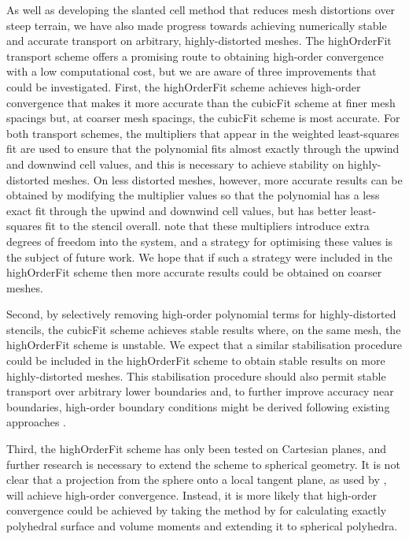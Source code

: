 As well as developing the slanted cell method that reduces mesh distortions over steep terrain, we have also made progress towards achieving numerically stable and accurate transport on arbitrary, highly-distorted meshes.
The highOrderFit transport scheme offers a promising route to obtaining high-order convergence with a low computational cost, but we are aware of three improvements that could be investigated.
First, the highOrderFit scheme achieves high-order convergence that makes it more accurate than the cubicFit scheme at finer mesh spacings but, at coarser mesh spacings, the cubicFit scheme is most accurate.
For both transport schemes, the multipliers that appear in the weighted least-squares fit are used to ensure that the polynomial fits almost exactly through the upwind and downwind cell values, and this is necessary to achieve stability on highly-distorted meshes.
On less distorted meshes, however, more accurate results can be obtained by modifying the multiplier values so that the polynomial has a less exact fit through the upwind and downwind cell values, but has better least-squares fit to the stencil overall.
\citet{devendran2017} note that these multipliers introduce extra degrees of freedom into the system, and a strategy for optimising these values is the subject of future work.
We hope that if such a strategy were included in the highOrderFit scheme then more accurate results could be obtained on coarser meshes.

Second, by selectively removing high-order polynomial terms for highly-distorted stencils, the cubicFit scheme achieves stable results where, on the same mesh, the highOrderFit scheme is unstable.
We expect that a similar stabilisation procedure could be included in the highOrderFit scheme to obtain stable results on more highly-distorted meshes.
This stabilisation procedure should also permit stable transport over arbitrary lower boundaries and, to further improve accuracy near boundaries, high-order boundary conditions might be derived following existing approaches \citep{devendran2017,schwartz2015}.

Third, the highOrderFit scheme has only been tested on Cartesian planes, and further research is necessary to extend the scheme to spherical geometry.
It is not clear that a projection from the sphere onto a local tangent plane, as used by \citet{sjoegreen2012}, will achieve high-order convergence.
Instead, it is more likely that high-order convergence could be achieved by taking the method by \citet{tuzikov2003} for calculating exactly polyhedral surface and volume moments and extending it to spherical polyhedra.

